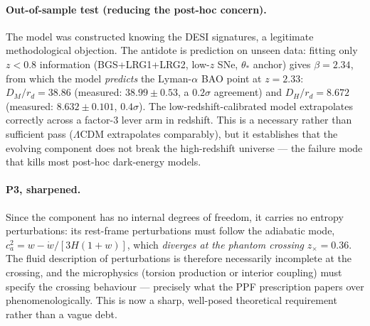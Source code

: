 \documentclass[11pt]{article}
\begin{document}
\paragraph{Out-of-sample test (reducing the post-hoc concern).} The model was constructed knowing the DESI signatures, a legitimate methodological objection. The antidote is prediction on unseen data: fitting only $z < 0.8$ information (BGS+LRG1+LRG2, low-$z$ SNe, $\theta_*$ anchor) gives $\beta = 2.34$, from which the model \emph{predicts} the Lyman-$\alpha$ BAO point at $z = 2.33$: $D_M/r_d = 38.86$ (measured: $38.99 \pm 0.53$, a $0.2\sigma$ agreement) and $D_H/r_d = 8.672$ (measured: $8.632 \pm 0.101$, $0.4\sigma$). The low-redshift-calibrated model extrapolates correctly across a factor-3 lever arm in redshift. This is a necessary rather than sufficient pass ($\Lambda$CDM extrapolates comparably), but it establishes that the evolving component does not break the high-redshift universe --- the failure mode that kills most post-hoc dark-energy models.

\paragraph{P3, sharpened.} Since the component has no internal degrees of freedom, it carries no entropy perturbations: its rest-frame perturbations must follow the adiabatic mode, $c_a^2 = w - \dot w/[3H(1+w)]$, which \emph{diverges at the phantom crossing} $z_\times = 0.36$. The fluid description of perturbations is therefore necessarily incomplete at the crossing, and the microphysics (torsion production or interior coupling) must specify the crossing behaviour --- precisely what the PPF prescription papers over phenomenologically. This is now a sharp, well-posed theoretical requirement rather than a vague debt.
\end{document}

